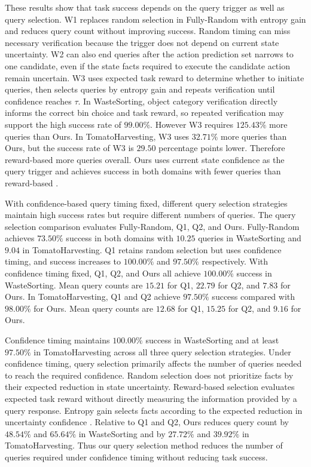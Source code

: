 These results show that task success depends on the query trigger as well as query selection. W1 replaces random selection in Fully-Random with entropy gain and reduces query count without improving success. Random timing can miss necessary verification because the trigger does not depend on current state uncertainty. W2 can also end queries after the action prediction set narrows to one candidate, even if the state facts required to execute the candidate action remain uncertain. W3 uses expected task reward to determine whether to initiate queries, then selects queries by entropy gain and repeats verification until confidence reaches $\tau$. In WasteSorting, object category verification directly informs the correct bin choice and task reward, so repeated verification may support the high success rate of $99.00\%$. However W3 requires $125.43\%$ more queries than Ours. In TomatoHarvesting, W3 uses $32.71\%$ more queries than Ours, but the success rate of W3 is $29.50$ percentage points lower. Therefore  reward-based  more queries overall. Ours uses current state confidence as the query trigger and achieves  success in both domains with fewer queries than  reward-based .

With confidence-based query timing fixed, different query selection strategies maintain high success rates but require different numbers of queries. The query selection comparison evaluates Fully-Random, Q1, Q2, and Ours. Fully-Random achieves $73.50\%$ success in both domains with $10.25$ queries in WasteSorting and $9.04$ in TomatoHarvesting. Q1 retains random selection but uses confidence timing, and success increases to $100.00\%$ and $97.50\%$ respectively. With confidence timing fixed, Q1, Q2, and Ours all achieve $100.00\%$ success in WasteSorting. Mean query counts are $15.21$ for Q1, $22.79$ for Q2, and $7.83$ for Ours. In TomatoHarvesting, Q1 and Q2 achieve $97.50\%$ success compared with $98.00\%$ for Ours. Mean query counts are $12.68$ for Q1, $15.25$ for Q2, and $9.16$ for Ours.

Confidence timing maintains $100.00\%$ success in WasteSorting and at least $97.50\%$ in TomatoHarvesting across all three query selection strategies. Under confidence timing, query selection primarily affects the number of queries needed to reach the required confidence. Random selection does not prioritize facts by their expected reduction in state uncertainty. Reward-based selection evaluates expected task reward without directly measuring the information provided by a query response. Entropy gain selects facts according to the expected reduction in  uncertainty  confidence . Relative to Q1 and Q2, Ours reduces query count by $48.54\%$ and $65.64\%$ in WasteSorting and by $27.72\%$ and $39.92\%$ in TomatoHarvesting. Thus our query selection method reduces the number of queries required under confidence timing without reducing task success.


